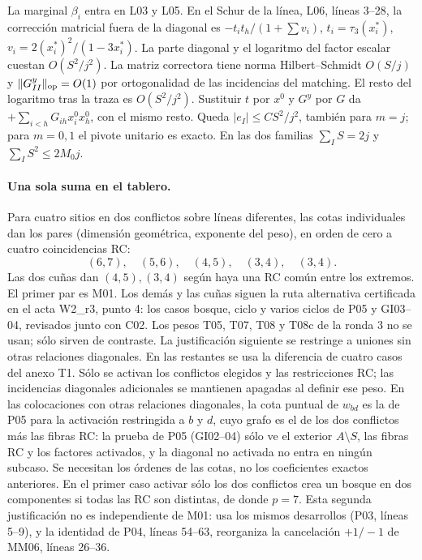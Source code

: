 La marginal $\beta_i$ entra en L03 y L05.
En el Schur de la línea, L06, líneas 3--28, la corrección matricial fuera de la
diagonal es $-t_i t_h/(1+\sum v_i)$, $t_i=\tau_3(x_i^*)$, $v_i=2(x_i^*)^2/(1-3x_i^*)$.
La parte diagonal y el logaritmo del factor escalar cuestan $O(S^2/j^2)$.
La matriz correctora tiene norma Hilbert--Schmidt $O(S/j)$ y
$\|G^y_{II}\|_{\rm op}=O(1)$ por ortogonalidad de las incidencias del matching.
El resto del logaritmo tras la traza es $O(S^2/j^2)$. Sustituir $t$ por $x^0$
y $G^y$ por $G$ da $+\sum_{i<h}G_{ih}x_i^0x_h^0$, con el mismo resto.
Queda $|e_I|\le CS^2/j^2$, también para $m=j$; para $m=0,1$ el pivote
unitario es exacto. En las dos familias $\sum_I S=2j$ y $\sum_I S^2\le2M_0 j$.

\paragraph{Una sola suma en el tablero.}
Para cuatro sitios en dos conflictos sobre líneas diferentes, las cotas individuales dan los pares
(dimensión geométrica, exponente del peso), en orden de cero a cuatro coincidencias RC:
\[
 (6,7),\quad(5,6),\quad(4,5),\quad(3,4),\quad(3,4).
\]
Las dos cuñas dan $(4,5),(3,4)$ según haya una RC común entre los extremos.
El primer par es M01. Los demás y las cuñas siguen la ruta alternativa certificada en el acta
W2\_r3, punto 4: los casos bosque, ciclo y varios ciclos de P05 y GI03--04, revisados junto con C02.
Los pesos T05, T07, T08 y T08c de la ronda 3 no se usan; sólo sirven de contraste.
La justificación siguiente se restringe a uniones sin otras relaciones diagonales.
En las restantes se usa la diferencia de cuatro casos del anexo T1.
Sólo se activan los conflictos elegidos y las restricciones RC; las incidencias
diagonales adicionales se mantienen apagadas al definir ese peso.
En las colocaciones con otras relaciones diagonales, la cota puntual de $w_{bd}$ es la de P05
para la activación restringida a $b$ y $d$, cuyo grafo es el de los dos conflictos más las
fibras RC: la prueba de P05 (GI02--04) sólo ve el exterior $A\setminus S$, las fibras RC
y los factores activados, y la diagonal no activada no entra en ningún subcaso.
Se necesitan los órdenes de las cotas, no los coeficientes exactos anteriores.
En el primer caso activar sólo los dos conflictos
crea un bosque en dos componentes si todas las RC son distintas, de donde $p=7$.
Esta segunda justificación no es independiente de M01: usa los mismos desarrollos
(P03, líneas 5--9), y la identidad de P04, líneas 54--63, reorganiza la cancelación
$+1/-1$ de MM06, líneas 26--36.
